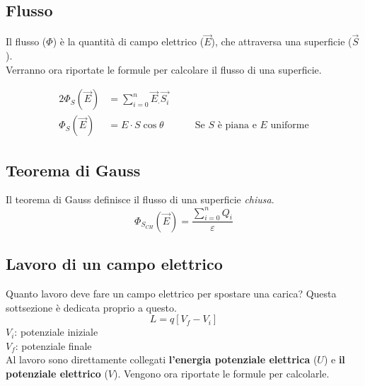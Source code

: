 \subsection{Flusso} \label{subsec:flusso}
Il flusso ($\Phi$) è la quantità di campo elettrico ($\vec{E}$), che 
attraversa una superficie ($\vec{S}$).\\
Verranno ora riportate le formule per calcolare il flusso di una superficie.

\begin{alignat*}{2}
  \Phi_S\left(\vec{E}\right) &= \sum\limits_{i=0}^{n}\vec{E}_\cdot\vec{S_i} &\quad &\\
  \Phi_S\left(\vec{E}\right) &= E\cdot S\cos\theta & &\text{Se } S \text{ è piana e } E \text{ 
  uniforme} 
\end{alignat*}
\begin{center}
\end{center}

\subsection{Teorema di Gauss}
Il teorema di Gauss definisce il flusso di una superficie \emph{chiusa}.
\begin{equation*}
\Phi_{S_{CH}}\left(\vec{E}\right) = \frac{\sum\limits_{i=0}^{n}Q_i}{\varepsilon}
\end{equation*}

\subsection{Lavoro di un campo elettrico}
Quanto lavoro deve fare un campo elettrico per spostare una carica? Questa sottsezione è dedicata 
proprio a questo.
\begin{equation*}
  L = q\left[V_f - V_i\right]
\end{equation*}
$V_i$: potenziale iniziale\\
$V_f$: potenziale finale\\ [\baselineskip]

Al lavoro sono direttamente collegati \textbf{l'energia potenziale elettrica} ($U$) e 
\textbf{il potenziale elettrico} ($V$). Vengono ora riportate le formule per calcolarle.

